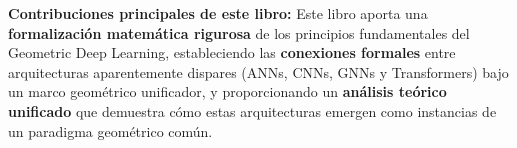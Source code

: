 \bigskip

\textbf{Contribuciones principales de este libro:} Este libro aporta una \textbf{formalización matemática rigurosa} de los principios fundamentales del Geometric Deep Learning, estableciendo las \textbf{conexiones formales} entre arquitecturas aparentemente dispares (\glspl{ANN}, \glspl{CNN}, \glspl{GNN} y \glspl{Transformer}) bajo un marco geométrico unificador, y proporcionando un \textbf{análisis teórico unificado} que demuestra cómo estas arquitecturas emergen como instancias de un paradigma geométrico común.